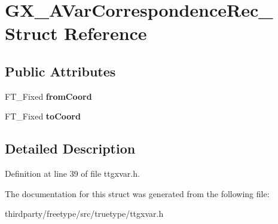 \hypertarget{struct_g_x___a_var_correspondence_rec__}{}\section{G\+X\+\_\+\+A\+Var\+Correspondence\+Rec\+\_\+ Struct Reference}
\label{struct_g_x___a_var_correspondence_rec__}
\subsection*{Public Attributes}
\begin{DoxyCompactItemize}
\item 
\mbox{\label{struct_g_x___a_var_correspondence_rec___a57c4ff645e02d48ff2035cbdd5ddf170}} 
F\+T\+\_\+\+Fixed {\bfseries from\+Coord}
\item 
\mbox{\label{struct_g_x___a_var_correspondence_rec___a8850378f736f342d1b649fecf956ea8a}} 
F\+T\+\_\+\+Fixed {\bfseries to\+Coord}
\end{DoxyCompactItemize}


\subsection{Detailed Description}


Definition at line 39 of file ttgxvar.\+h.



The documentation for this struct was generated from the following file\+:\begin{DoxyCompactItemize}
\item 
thirdparty/freetype/src/truetype/ttgxvar.\+h\end{DoxyCompactItemize}
